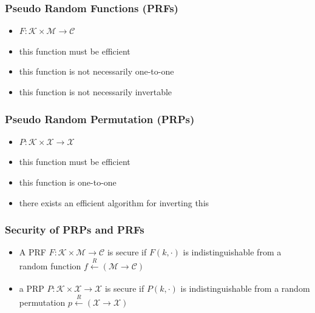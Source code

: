 \documentclass{beamer}
\begin{document}
\begin{frame}
    \frametitle{Pseudo Random Functions (PRFs)}
    \begin{itemize}
        \item \pause \(F: \mathcal{K} \times \mathcal{M} \rightarrow \mathcal{C} \) \pause
        \item  this function must be efficient \pause
        \item  this function is not necessarily one-to-one \pause
        \item  this function is not necessarily invertable \pause
    \end{itemize}
\end{frame}

\begin{frame}
    \frametitle{Pseudo Random Permutation (PRPs)}
    \begin{itemize}
        \item \pause \(P: \mathcal{K} \times \mathcal{X} \rightarrow \mathcal{X} \) \pause
        \item  this function must be efficient \pause
        \item  this function is one-to-one \pause
        \item  there exists an efficient algorithm for inverting this \pause
    \end{itemize}
\end{frame}

\begin{frame}
    \frametitle{Security of PRPs and PRFs}
    \begin{itemize}
        \item \pause A PRF \(F: \mathcal{K} \times \mathcal{M} \rightarrow \mathcal{C} \) is secure  if \(F(k, \cdot)\) is indistinguishable from a random function \(f \xleftarrow[]{R} (\mathcal{M} \rightarrow \mathcal{C})\) \pause
        \item a PRP  \( P: \mathcal{K} \times \mathcal{X} \rightarrow \mathcal{X} \) is secure if \(P(k, \cdot)\) is indistinguishable from a random permutation \(p \xleftarrow[]{R} (\mathcal{X} \rightarrow \mathcal{X})\)
    \end{itemize}
\end{frame}
\end{document}
